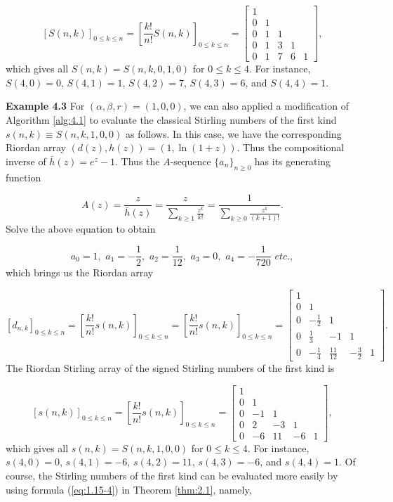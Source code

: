 \[
\left[ S(n,k)\right]_{0\leq k \leq n}= \left[ \frac{k!}{n!} S(n,k)\right]_{0\leq k\leq n}=\left[ \begin{array}{rrrrr} 1 &  & & &  \\
0 &1 & & & \\ 0 &1& 1& &  \\ 0 & 1& 3 &1 & \\ 0 & 1& 7& 6& 1\end{array}\right],
\]
which gives all $S(n,k)=S(n,k,0,1,0)$ for $0\leq k \leq 4$. For instance, $S(4,0)=0$, $S(4,1)=1$, $S(4,2)=7$, $S(4,3)=6$, and $S(4,4)=1$.

{\bf Example 4.3} For $(\alpha, \beta, r)=(1,0,0)$, we can also applied a modification of Algorithm \ref{alg:4.1} to evaluate the classical Stirling numbers of the first kind $s(n,k)\equiv S(n,k,1,0,0)$ as follows.
In this case, we have the corresponding Riordan array $(d(z), h(z))=(1, \ln (1+z))$. Thus the compositional inverse of $\bar h(z)=e^z-1$. Thus the $A$-sequence $\{ a_n\}_{n\geq 0}$ has its generating function

\[
A(z)=\frac{z}{\bar h(z)}=\frac{z}{\sum_{k\geq 1} \frac{z^k}{k!}}=\frac{1}{\sum_{k\geq 0} \frac{z^k}{(k+1)!}}.
\]
Solve the above equation to obtain

\[
a_0=1, \,\, a_1=-\frac{1}{2}, \,\, a_2=\frac{1}{12},\,\, a_3=0,\,\,  a_4=-\frac{1}{720}\,\, etc.,
\]
which brings us the Riordan array

\[
[d_{n,k}]_{0\leq k\leq n}=\left[ \frac{k!}{n!} s(n,k)\right]_{0\leq k\leq n}=\left[ \frac{k!}{n!} s(n,k)\right]_{0\leq k\leq n}=\left[ \begin{array}{rrrrr} 1 &  & & &  \\
0 &1 & & & \\ 0 &-\frac{1}{2}& 1& &  \\0 & \frac{1}{3}& -1 &1 & \\ 0 & -\frac{1}{4}& \frac{11}{12}& -\frac{3}{2}& 1\end{array}\right].
\]
The Riordan Stirling array of the signed Stirling numbers of the first kind is

\[
\left[ s(n,k)\right]_{0\leq k \leq n}= \left[ \frac{k!}{n!} s(n,k)\right]_{0\leq k\leq n}=\left[ \begin{array}{rrrrr} 1 &  & & &  \\
0 &1 & & & \\ 0 &-1& 1& &  \\ 0 & 2& -3 &1 & \\ 0 & -6& 11& -6& 1\end{array}\right],
\]
which gives all $s(n,k)=S(n,k,1,0,0)$ for $0\leq k \leq 4$. For instance, $s(4,0)=0$, $s(4,1)=-6$, $s(4,2)=11$, $s(4,3)=-6$, and $s(4,4)=1$. Of course, the Stirling numbers of the first kind can be evaluated more easily by using formula (\ref{eq:1.15-4}) in Theorem \ref{thm:2.1}, namely,

